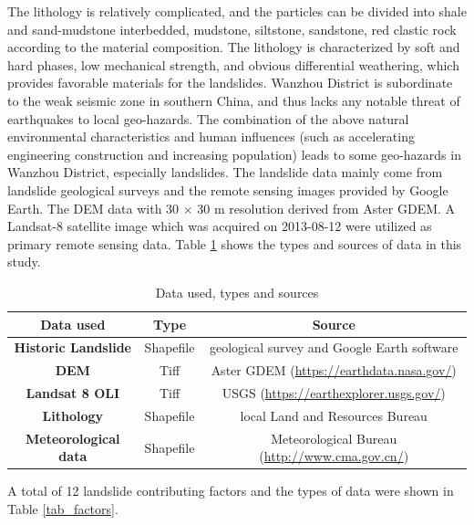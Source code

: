 \documentclass[a4paper,fleqn]{cas-sc}
\begin{document}
The lithology is relatively complicated, and the particles can be divided into shale and sand-mudstone interbedded, mudstone, siltstone, sandstone, red clastic rock according to the material composition. 
The lithology is characterized by soft and hard phases, low mechanical strength, and obvious differential weathering, which provides favorable materials for the landslides. 
Wanzhou District is subordinate to the weak seismic zone in southern China, and thus lacks any notable threat of earthquakes to local geo-hazards. 
The combination of the above natural environmental characteristics and human influences (such as accelerating engineering construction and increasing population) leads to some geo-hazards in Wanzhou District, especially landslides. 
The landslide data mainly come from landslide geological surveys and the remote sensing images provided by Google Earth. 
The DEM data with 30 $\times$ 30 m resolution derived from Aster GDEM. 
A Landsat-8 satellite image which was acquired on 2013-08-12 were utilized as primary remote sensing data. 
Table \ref{tab_datasource} shows the types and sources of data in this study. 

\begin{table}
  \centering
  \caption{Data used, types and sources}
  \begin{tabular}{ccc}
    \toprule
    {\textbf{Data used}} & \textbf{Type} & \textbf{Source}\\
    \midrule
    \textbf{Historic Landslide} & Shapefile & geological survey and Google Earth software\\
    \textbf{DEM} & Tiff & Aster GDEM (\url{https://earthdata.nasa.gov/})\\
    \textbf{Landsat 8 OLI} & Tiff & USGS (\url{https://earthexplorer.usgs.gov/})\\
    \textbf{Lithology} & Shapefile & local Land and Resources Bureau\\
    \textbf{Meteorological data} & Shapefile & Meteorological Bureau (\url{http://www.cma.gov.cn/})\\
    \bottomrule
  \end{tabular}
  \label{tab_datasource}
\end{table}

A total of 12 landslide contributing factors and the types of data were shown in Table \ref{tab_factors}. 
\end{document}
